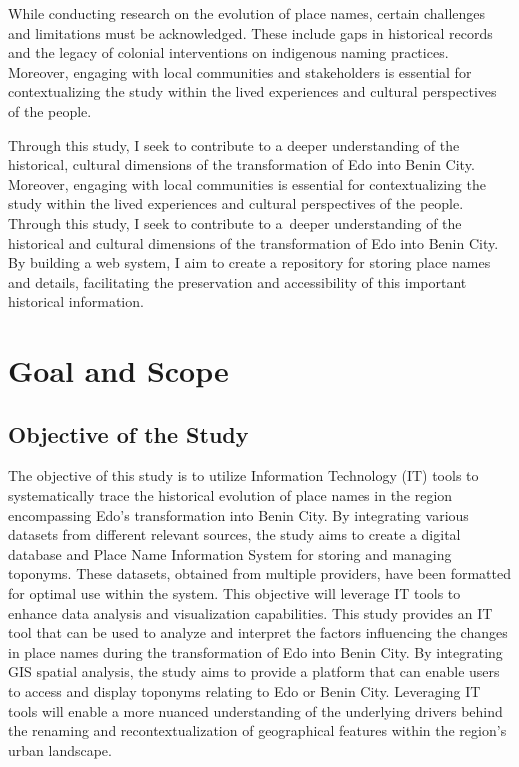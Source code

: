 While conducting research on the evolution of place names, certain challenges and limitations must be acknowledged. These include gaps in historical records and the legacy of colonial interventions on indigenous naming practices. Moreover, engaging with local communities and stakeholders is essential for contextualizing the study within the lived experiences and cultural perspectives of the people. 

Through this study, I seek to contribute to a deeper understanding of the historical, cultural dimensions of the transformation of Edo into Benin City. Moreover, engaging with local communities is essential for contextualizing the study within the lived experiences and cultural perspectives of the people. Through this study, I seek to contribute to a~deeper understanding of the historical and cultural dimensions of the transformation of Edo into Benin City. By building a web system, I aim to create a repository for storing place names and details, facilitating the preservation and accessibility of this important historical information.

\section{Goal and Scope}
\subsection{Objective of the Study}
The objective of this study is to utilize Information Technology (IT) tools to systematically trace the historical evolution of place names in the region encompassing Edo's transformation into Benin City. By integrating various datasets from different relevant sources, the study aims to create a digital database and Place Name Information System for storing and managing toponyms. These datasets, obtained from multiple providers, have been formatted for optimal use within the system. This objective will leverage IT tools to enhance data analysis and visualization capabilities.
This study provides an IT tool that can be used to analyze and interpret the factors influencing the changes in place names during the transformation of Edo into Benin City. By integrating GIS spatial analysis, the study aims to provide a platform that can enable users to access and display toponyms relating to Edo or Benin City. Leveraging IT tools will enable a more nuanced understanding of the underlying drivers behind the renaming and recontextualization of geographical features within the region's urban landscape.
